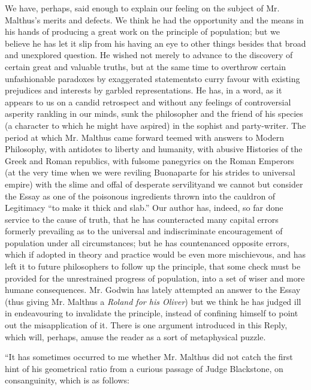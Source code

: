 We have, perhaps, said enough to explain our feeling on the
subject of Mr. Malthus's merits and defects. We think he had the
opportunity and the means in his hands of producing a great work
on the principle of population; but we believe he has let it slip
from his having an eye to other things besides that broad and
unexplored question. He wished not merely to advance to the
discovery of certain great and valuable truths, but at the same
time to overthrow certain unfashionable paradoxes by exaggerated
statements\textemdash to curry favour with existing prejudices and
interests by garbled representations. He has, in a word, as it
appears to us on a candid retrospect and without any feelings of
controversial asperity rankling in our minds, sunk the philosopher
and the friend of his species (a character to which he might have
aspired) in the sophist and party-writer. The period at which
Mr. Malthus came forward teemed with answers to Modern Philosophy,
with antidotes to liberty and humanity, with abusive Histories of
the Greek and Roman republics, with fulsome panegyrics on the
Roman Emperors (at the very time when we were reviling Buonaparte
for his strides to universal empire) with the slime and offal of
desperate servility\textemdash and we cannot but consider the
Essay as one of the poisonous ingredients thrown into the cauldron
of Legitimacy ``to make it thick and slab.'' Our author has,
indeed, so far done service to the cause of truth, that he has
counteracted many capital errors formerly prevailing as to the
universal and indiscriminate encouragement of population under all
circumstances; but he has countenanced opposite errors, which if
adopted in theory and practice would be even more mischievous, and
has left it to future philosophers to follow up the principle,
that some check must be provided for the unrestrained progress of
population, into a set of wiser and more humane
consequences. Mr. Godwin has lately attempted an answer to the
Essay (thus giving Mr. Malthus a \emph{Roland for his Oliver}) but
we think he has judged ill in endeavouring to invalidate the
principle, instead of confining himself to point out the
misapplication of it. There is one argument introduced in this
Reply, which will, perhaps, amuse the reader as a sort of
metaphysical puzzle.

``It has sometimes occurred to me whether Mr. Malthus did not
catch the first hint of his geometrical ratio from a curious
passage of Judge Blackstone, on consanguinity, which is as
follows:\textemdash

